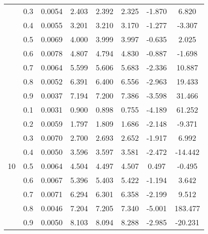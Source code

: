 \documentclass[11pt,a4paper]{report}
\begin{document}
\begin{longtable}{ | c | c || c | c | c | c | c | c | }
 & 0.3 & 0.0054 & 2.403 & 2.392 & 2.325 & -1.870 & 6.820 \\
 & 0.4 & 0.0055 & 3.201 & 3.210 & 3.170 & -1.277 & -3.307 \\
 & 0.5 & 0.0069 & 4.000 & 3.999 & 3.997 & -0.635 & 2.025 \\
 & 0.6 & 0.0078 & 4.807 & 4.794 & 4.830 & -0.887 & -1.698 \\
 & 0.7 & 0.0064 & 5.599 & 5.606 & 5.683 & -2.336 & 10.887 \\
 & 0.8 & 0.0052 & 6.391 & 6.400 & 6.556 & -2.963 & 19.433 \\
 & 0.9 & 0.0037 & 7.194 & 7.200 & 7.386 & -3.598 & 31.466 \\
 \hline
\multirow{9}{*}{10} & 0.1 & 0.0031 & 0.900 & 0.898 & 0.755 & -4.189 & 61.252 \\
 & 0.2 & 0.0059 & 1.797 & 1.809 & 1.686 & -2.148 & -9.371 \\
 & 0.3 & 0.0070 & 2.700 & 2.693 & 2.652 & -1.917 & 6.992 \\
 & 0.4 & 0.0050 & 3.596 & 3.597 & 3.581 & -2.472 & -14.442 \\
 & 0.5 & 0.0064 & 4.504 & 4.497 & 4.507 & 0.497 & -0.495 \\
 & 0.6 & 0.0067 & 5.396 & 5.403 & 5.422 & -1.194 & 3.642 \\
 & 0.7 & 0.0071 & 6.294 & 6.301 & 6.358 & -2.199 & 9.512 \\
 & 0.8 & 0.0046 & 7.204 & 7.205 & 7.340 & -5.001 & 183.477 \\
 & 0.9 & 0.0050 & 8.103 & 8.094 & 8.288 & -2.985 & -20.231 \\
 \hline
\hline
\end{longtable}
\end{document}
